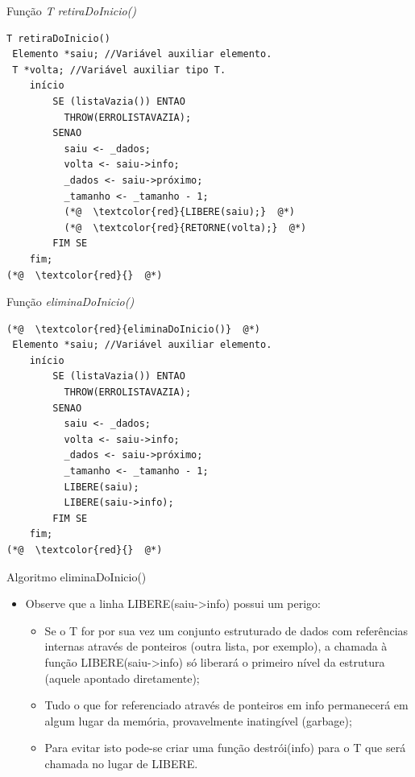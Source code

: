 \documentclass[12pt,table,xcolor={dvipsnames}]{beamer}
\begin{document}
\begin{frame}[fragile]{Função \textit{T retiraDoInicio()}}
\begin{lstlisting}
T retiraDoInicio()
 Elemento *saiu; //Variável auxiliar elemento.
 T *volta; //Variável auxiliar tipo T.
	início
		SE (listaVazia()) ENTAO
		  THROW(ERROLISTAVAZIA);
		SENAO
		  saiu <- _dados;
		  volta <- saiu->info;
		  _dados <- saiu->próximo;
		  _tamanho <- _tamanho - 1;
		  (*@  \textcolor{red}{LIBERE(saiu);}  @*)
		  (*@  \textcolor{red}{RETORNE(volta);}  @*)
		FIM SE
	fim;
(*@  \textcolor{red}{}  @*)
\end{lstlisting}
\end{frame}

\begin{frame}[fragile]{Função \textit{eliminaDoInicio()}}
\begin{lstlisting}
(*@  \textcolor{red}{eliminaDoInicio()}  @*)
 Elemento *saiu; //Variável auxiliar elemento.
	início
		SE (listaVazia()) ENTAO
		  THROW(ERROLISTAVAZIA);
		SENAO
		  saiu <- _dados;
		  volta <- saiu->info;
		  _dados <- saiu->próximo;
		  _tamanho <- _tamanho - 1;
		  LIBERE(saiu);
		  LIBERE(saiu->info);
		FIM SE
	fim;
(*@  \textcolor{red}{}  @*)
\end{lstlisting}
\end{frame}

\begin{frame}[fragile]{Algoritmo eliminaDoInicio()}
\begin{itemize}
\item Observe que a linha LIBERE(saiu->info) possui um perigo:
\begin{itemize}
\item Se o T for por sua vez um conjunto estruturado de dados com referências internas através de ponteiros (outra lista, por exemplo), a chamada à função LIBERE(saiu->info) só liberará o primeiro nível da estrutura (aquele apontado diretamente);
\item Tudo o que for referenciado através de ponteiros em info permanecerá em algum lugar da memória, provavelmente inatingível (garbage);
\item Para evitar isto pode-se criar uma função destrói(info) para o T que será chamada no lugar de LIBERE.
\end{itemize}
\end{itemize}
\end{frame}
\end{document}
